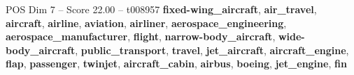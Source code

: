 \begin{textsample}{POS Dim 7 – Score 22.00 – t008957}  \label{ex:f7_pos_014}
\textbf{fixed-wing\_aircraft}, \textbf{air\_travel}, \textbf{aircraft}, \textbf{airline}, \textbf{aviation}, \textbf{airliner}, \textbf{aerospace\_engineering}, \textbf{aerospace\_manufacturer}, \textbf{flight}, \textbf{narrow-body\_aircraft}, \textbf{wide-body\_aircraft}, \textbf{public\_transport}, \textbf{travel}, \textbf{jet\_aircraft}, \textbf{aircraft\_engine}, \textbf{flap}, \textbf{passenger}, \textbf{twinjet}, \textbf{aircraft\_cabin}, \textbf{airbus}, \textbf{boeing}, \textbf{jet\_engine}, \textbf{fin}

\end{textsample}
